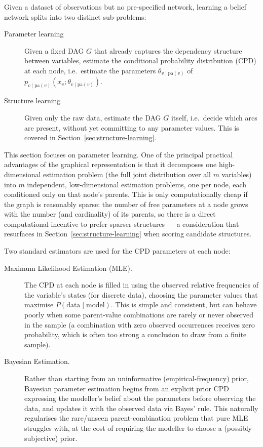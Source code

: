 Given a dataset of observations but no pre-specified network, learning a
belief network splits into two distinct sub-problems:

\begin{description}
  \item[Parameter learning] Given a fixed DAG $G$ that already captures the
    dependency structure between variables, estimate the conditional
    probability distribution (CPD) at each node, i.e.\ estimate the
    parameters $\theta_{v \mid \mathrm{pa}(v)}$ of
    $p_{v \mid \mathrm{pa}(v)}(x_v; \theta_{v\mid\mathrm{pa}(v)})$.
  \item[Structure learning] Given only the raw data, estimate the DAG $G$
    itself, i.e.\ decide which arcs are present, without yet committing to
    any parameter values. This is covered in
    Section~\ref{sec:structure-learning}.
\end{description}

This section focuses on parameter learning. One of the principal practical
advantages of the graphical representation is that it decomposes one
high-dimensional estimation problem (the full joint distribution over all
$m$ variables) into $m$ independent, low-dimensional estimation problems, one
per node, each conditioned only on that node's parents. This is only
computationally cheap if the graph is reasonably sparse: the number of free
parameters at a node grows with the number (and cardinality) of its parents,
so there is a direct computational incentive to prefer sparser structures —
a consideration that resurfaces in Section~\ref{sec:structure-learning} when
scoring candidate structures.

Two standard estimators are used for the CPD parameters at each node:

\begin{description}
  \item[Maximum Likelihood Estimation (MLE).] The CPD at each node is filled in
    using the observed relative frequencies of the variable's states (for
    discrete data), choosing the parameter values that maximise
    $P(\text{data} \mid \text{model})$. This is simple and consistent, but can
    behave poorly when some parent-value combinations are rarely or never
    observed in the sample (a combination with zero observed occurrences
    receives zero probability, which is often too strong a conclusion to draw
    from a finite sample).
  \item[Bayesian Estimation.] Rather than starting from an uninformative
    (empirical-frequency) prior, Bayesian parameter estimation begins from an
    explicit prior CPD expressing the modeller's belief about the parameters
    before observing the data, and updates it with the observed data
    via Bayes' rule. This naturally regularises the rare/unseen
    parent-combination problem that pure MLE struggles with, at the cost of
    requiring the modeller to choose a (possibly subjective) prior.
\end{description}

